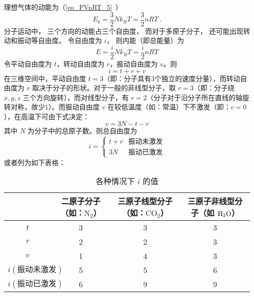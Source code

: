 
\begin{issues}
\issueDraft
\end{issues}


理想气体的动能为（\autoref{eq_PVnRT_5}~）
\begin{equation}
E_k = \frac32 Nk_B T = \frac{3}{2}nRT~.
\end{equation}
分子运动中， 三个方向的动能占三个自由度， 而对于多原子分子， 还可能出现转动和振动等自由度。 令自由度为 $i$， 则内能（即总能量）为
\begin{equation}\label{eq_IdgEng_1}
E = \frac{i}{2}Nk_B T = \frac{i}{2}nRT
\end{equation}
令平动自由度为 $t$，转动自由度为 $r$，振动自由度为 $v$。则
\begin{equation}
i=t+r+v
\end{equation}
在三维空间中，平动自由度 $t=3$（即：分子具有3个独立的速度分量），而转动自由度为 $r$ 取决于分子的形状。对于一般的非线型分子，取 $r=3$（即：分子绕 $x,y,z$ 三个方向旋转），而对线型分子，有 $r=2$（分子对于沿分子所在直线的轴旋转对称，故少1）。而振动自由度 $v$ 在较低温度（如：常温）下不激发（即：$v=0$），在高温下可由下式决定：
\begin{equation}
v=3N-t-r
\end{equation}
其中 $N$ 为分子中的总原子数。则总自由度为
\begin{equation}
i=\left\{\begin{matrix}{t+r}&{\text{振动未激发}}\\{3N}&{\text{振动已激发}}\end{matrix}\right.
\end{equation}
或者列为如下表格：\begin{table}[ht]
\centering
\caption{各种情况下 $i$ 的值}\label{tab_IdgEng_1}
\begin{tabular}{|c|c|c|c|}
\hline
 & 二原子分子（如：$\text{N}_2$） & 三原子线型分子（如：$\text{CO}_2$） & 三原子非线型分子（如 $\text H_2\text O$） \\
\hline
$t$ & 3 & 3 & 3 \\
\hline
$r$ & 2 & 2 & 3 \\
\hline
$v$ & 1 & 4 & 3 \\
\hline
$i(\text{振动未激发})$ & 5 & 5 & 6 \\
\hline
$i(\text{振动已激发})$ & 6 & 9 & 9 \\
\hline
\end{tabular}
\end{table}
